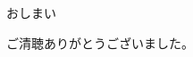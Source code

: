 \documentclass[unicode,12pt]{beamer}%
\begin{document}






%
\begin{frame}
\begin{block}{}
	\begin{center}
	\LARGE{おしまい}

	\large{ご清聴ありがとうございました。}
	\end{center}
\end{block}
\end{frame}
\end{document}
